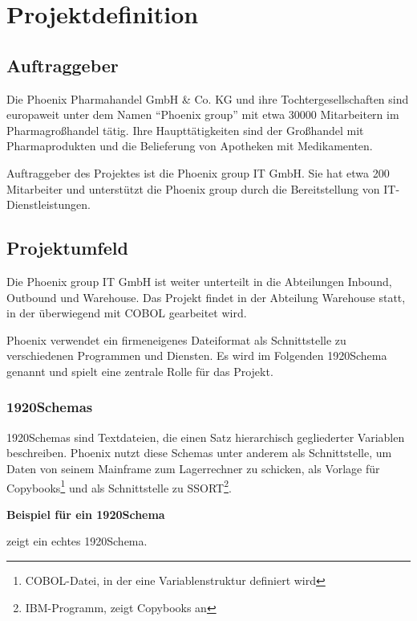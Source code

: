 \section{Projektdefinition}
\label{sec:Einleitung}
\subsection{Auftraggeber}
\label{sec:Auftraggeber}
Die Phoenix Pharmahandel GmbH \& Co. KG und ihre Tochtergesellschaften sind europaweit unter dem Namen ``Phoenix group'' mit etwa 30000 Mitarbeitern im Pharmagroßhandel tätig. Ihre Haupttätigkeiten sind der Großhandel mit Pharmaprodukten und die Belieferung von Apotheken mit Medikamenten.

Auftraggeber des Projektes ist die Phoenix group IT GmbH. Sie hat etwa 200 Mitarbeiter und unterstützt die Phoenix group durch die Bereitstellung von IT-Dienstleistungen.

\subsection{Projektumfeld} 
\label{sec:Projektumfeld}
Die Phoenix group IT GmbH ist weiter unterteilt in die Abteilungen Inbound, Outbound und Warehouse. Das Projekt findet in der Abteilung Warehouse statt, in der überwiegend mit COBOL gearbeitet wird.

Phoenix verwendet ein firmeneigenes Dateiformat als Schnittstelle zu verschiedenen Programmen und Diensten. Es wird im Folgenden 1920Schema genannt und spielt eine zentrale Rolle für das Projekt.

\subsubsection{1920Schemas}
1920Schemas sind Textdateien, die einen Satz hierarchisch gegliederter Variablen beschreiben. Phoenix nutzt diese Schemas unter anderem als Schnittstelle, um Daten von seinem Mainframe zum Lagerrechner zu schicken, als Vorlage für Copybooks\footnote{COBOL-Datei, in der eine Variablenstruktur definiert wird} und als Schnittstelle zu SSORT\footnote{IBM-Programm, zeigt Copybooks an}.

\textbf{Beispiel für ein 1920Schema}

 zeigt ein echtes 1920Schema.

